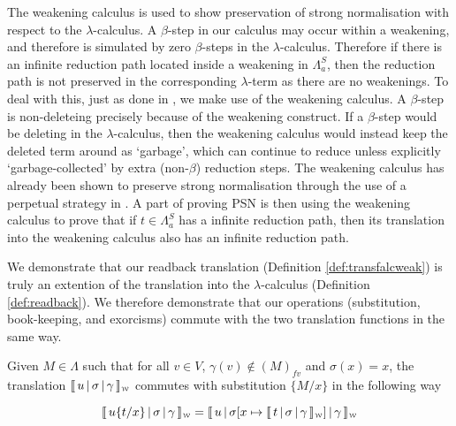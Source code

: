 \documentclass[a4paper,UKenglish,cleveref, autoref]{lipics-v2019}
\newcommand{\FALC}{\Lambda^{S}_{a}}
\newcommand{\fv}[1]{(#1)_{fv}}
\newcommand{\sub}[3]{#1 \{ #2 / #3 \}}
\newcommand{\weaksymbol}{\mbox{\tiny $\mathcal{W}$}}
\newcommand{\readweakwmap}[3]{\llbracket \, #1 \, \vert \, #2 \, \vert \, #3  \, \rrbracket_{\weaksymbol} }
\begin{document}
The weakening calculus is used to show preservation of strong normalisation with respect to the $\lambda$-calculus. A $\beta$-step in our calculus may occur within a weakening, and therefore is simulated by zero $\beta$-steps in the $\lambda$-calculus. Therefore if there is an infinite reduction path located inside a weakening in $\FALC$, then the reduction path is not preserved in the corresponding $\lambda$-term as there are no weakenings. To deal with this, just as done in \cite{kesneraccattoli12, gundersen2013atomic, he2018atomic}, we make use of the weakening calculus. A $\beta$-step is non-deleteing precisely because of the weakening construct. If a $\beta$-step would be deleting in the $\lambda$-calculus, then the weakening calculus would instead keep the deleted term around as `garbage', which can continue to reduce unless explicitly `garbage-collected' by extra (non-$\beta$) reduction steps. The weakening calculus has already been shown to preserve strong normalisation through the use of a perpetual strategy in \cite{gundersen2013atomic}. A part of proving PSN is then using the weakening calculus to prove that if $t \in \FALC$ has a infinite reduction path, then its translation into the weakening calculus also has an infinite reduction path.

\noindent We demonstrate that our readback translation (Definition \ref{def:transfalcweak}) is truly an extention of the translation into the $\lambda$-calculus (Definition \ref{def:readback}). We therefore demonstrate that our operations (substitution, book-keeping, and exorcisms) commute with the two translation functions in the same way.

\begin{proposition}
\label{prop:suboutcomm}
Given $M \in \Lambda$ such that for all $v \in V$, $\gamma(v) \not\in \fv{M}$  and $\sigma(x) = x$, the translation $\readweakwmap{u}{\sigma}{\gamma}$ commutes with substitution $\sub{}{M}{x}$ in the following way

$$\readweakwmap{u \sub{}{t}{x}}{\sigma}{\gamma} = \readweakwmap{u}{\sigma[x \mapsto \readweakwmap{t}{\sigma}{\gamma}]}{\gamma}$$
\end{proposition}
\end{document}

